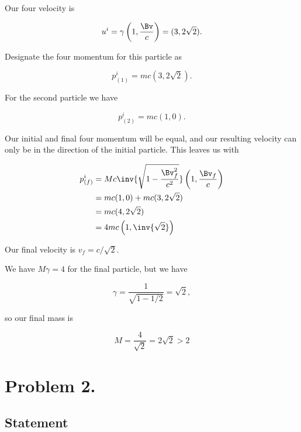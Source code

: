 Our four velocity is

\begin{equation}\label{eqn:relElectroDynProblemSet2:n}
u^i
= \gamma \left( 1, \frac{\Bv}{c} \right) = ( 3, 2 \sqrt{2} ).
\end{equation}

Designate the four momentum for this particle as

\begin{equation}\label{eqn:relElectroDynProblemSet2:n}
p_{(1)}^i = m c ( 3, 2 \sqrt{2} ).
\end{equation}

For the second particle we have

\begin{equation}\label{eqn:relElectroDynProblemSet2:n}
p_{(2)}^i = m c ( 1, 0 ).
\end{equation}

Our initial and final four momentum will be equal, and our resulting velocity can only be in the direction of the initial particle.  This leaves us with

\begin{align*}
p_{(f)}^i
&= M c \inv{\sqrt{1 - \frac{\Bv_f^2}{c^2}}} \left( 1, \frac{\Bv_f}{c} \right) \\
&= m c ( 1, 0 ) + m c ( 3, 2 \sqrt{2} )  \\
&= m c ( 4, 2 \sqrt{2} ) \\
&= 4 m c \left( 1, \inv{\sqrt{2}} \right)
\end{align*}

Our final velocity is $v_f = c/\sqrt{2}$.

We have $M \gamma = 4$ for the final particle, but we have

\begin{equation}\label{eqn:relElectroDynProblemSet2:n}
\gamma = \frac{1}{\sqrt{1 - 1/2}} = \sqrt{2},
\end{equation}

so our final mass is

\begin{equation}\label{eqn:relElectroDynProblemSet2:n}
M = \frac{4}{\sqrt{2}} = 2 \sqrt{2} > 2
\end{equation}

\section{Problem 2.}
\subsection{Statement}

